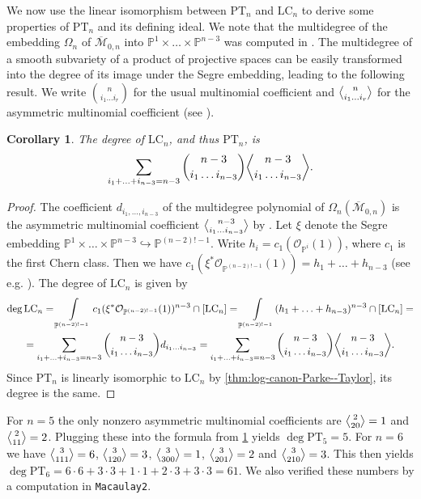 \documentclass[12pt, reqno]{amsart}
\numberwithin{equation}{section}
\theoremstyle{plain}
\newtheorem{corollary}[theorem]{Corollary}
\theoremstyle{definition}
\newenvironment{example}
  {\pushQED{\qed}\renewcommand{\qedsymbol}{$\triangle$}\examplex}
  {\popQED\endexamplex}
\newcommand{\monbar}{\overline{\mathcal{M}}_{0, n}}
\newcommand{\pt}{\mathrm{PT}}
\newcommand{\lc}{\mathrm{LC}}
\DeclareRobustCommand{\abinom}{\genfrac{\langle}{\rangle}{0pt}{}}
\begin{document}
We now use the linear isomorphism between $\mathrm{PT}_n$ and $\mathrm{LC}_n$ to derive some properties of $\pt_n$ and its defining ideal. We note that the multidegree of the embedding $\Omega_n$ of $\monbar$ into $\mathbb{P}^1\times\ldots\times \mathbb{P}^{n-3}$ was computed in \cite{cavalieri2021projective}. The multidegree of a smooth subvariety of a product of projective spaces can be easily transformed into the degree of its image under the Segre embedding, leading to the following result. We write $\binom{n}{i_1\ldots i_{r}}$ for the usual multinomial coefficient and $\abinom{n}{i_1\ldots i_{r}}$ for the asymmetric multinomial coefficient (see \cite[Definition 4.11]{cavalieri2021projective}).

\begin{corollary} \label{cor:degree}
The degree of $\lc_n$, and thus $\pt_n$, is
$$\sum\limits_{i_1+\ldots+i_{n-3}=n-3} \binom{n-3}{i_1\ldots i_{n-3}}\abinom{n-3}{i_1\ldots i_{n-3}}.$$
\end{corollary}

\begin{proof}
    The coefficient $d_{i_1,\ldots,i_{n-3}}$ of the multidegree polynomial of $\Omega_n(\monbar)$ is the asymmetric multinomial coefficient $\abinom{n-3}{i_1\ldots i_{n-3}}$ by \cite[Theorem 1.1]{cavalieri2021projective}. Let $\xi$ denote the Segre embedding $\mathbb{P}^1\times\ldots\times \mathbb{P}^{n-3}\hookrightarrow \mathbb{P}^{(n-2)!-1}$.  Write $h_i=c_1(\mathcal{O}_{\mathbb{P}^i}(1))$, where 
    $c_1$ is the first Chern class. Then we have $c_1(\xi^*\mathcal{O}_{\mathbb{P}^{(n-2)!-1}}(1))=h_1+\ldots+h_{n-3}$ (see e.g. \cite[Equation (3.5)]{kozhasov2023minimal}). The degree of $\mathrm{LC}_n$ is given by 
    \begin{multline*}
        \deg \mathrm{LC}_n = \int\limits_{\mathbb{P}^{(n-2)!-1}} c_1(\xi^*\mathcal{O}_{\mathbb{P}^{(n-2)!-1}}(1))^{n-3}\cap[\mathrm{LC}_n] = \int\limits_{\mathbb{P}^{(n-2)!-1}}(h_1+\ldots+h_{n-3})^{n-3}\cap [\mathrm{LC}_n] =\\ =\sum\limits_{i_1+\ldots+i_{n-3}=n-3} \binom{n-3}{i_1\ldots i_{n-3}}d_{i_1\ldots i_{n-3}}=\sum\limits_{i_1+\ldots+i_{n-3}=n-3} \binom{n-3}{i_1\ldots i_{n-3}}\abinom{n-3}{i_1\ldots i_{n-3}}.\end{multline*}
Since $\mathrm{PT}_n$ is linearly isomorphic to $\mathrm{LC}_n$ by \cref{thm:log-canon-Parke--Taylor}, its degree is the same. 
\end{proof}

\begin{example}
For $n=5$ the only nonzero asymmetric multinomial coefficients are $\abinom{2}{20} = 1$ and $\abinom{2}{1 1}=2$. Plugging these into the formula from \cref{cor:degree} yields $\deg \pt_5 = 5$. For $n=6$ we have $\abinom{3}{111}=6$, $\abinom{3}{120}=3$, $\abinom{3}{3 0 0 } = 1$, $\abinom{3}{2 0 1}=2$ and $\abinom{3}{210}=3$. This then yields $\deg\pt_6 = 6\cdot 6+ 3\cdot 3+ 1\cdot 1+ 2\cdot3 + 3\cdot 3 = 61$. We also verified these numbers by a computation in \texttt{Macaulay2}. 
\end{example}
\end{document}
